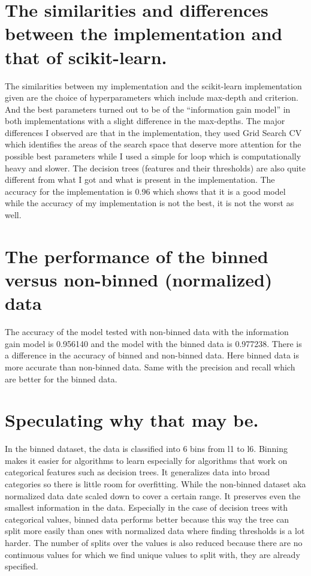 \documentclass[a4paper]{article}
\begin{document}
\section*{The similarities and differences between the implementation and that of scikit-learn.}
The similarities between my implementation and the scikit-learn implementation given are the choice of hyperparameters which include max-depth and criterion. And the best parameters turned out to be of the “information gain model” in both implementations with a slight difference in the max-depths. The major differences I observed are that in the implementation, they used Grid Search CV which identifies the areas of the search space that deserve more attention for the possible best parameters while I used a simple for loop which is computationally heavy and slower. The decision trees (features and their thresholds) are also quite different from what I got and what is present in the implementation. The accuracy for the implementation is 0.96 which shows that it is a good model while the accuracy of my implementation is not the best, it is not the worst as well.


\section*{The performance of the binned versus non-binned (normalized) data}
The accuracy of the model tested with non-binned data with the information gain model is 0.956140 and the model with the binned data is 0.977238. There is a difference in the accuracy of binned and non-binned data. Here binned data is more accurate than non-binned data. Same with the precision and recall which are better for the binned data.

\section*{Speculating why that may be.}
In the binned dataset, the data is classified into 6 bins from l1 to l6. Binning makes it easier for algorithms to learn especially for algorithms that work on categorical features such as decision trees. It generalizes data into broad categories so there is little room for overfitting. While the non-binned dataset aka normalized data date scaled down to cover a certain range. It preserves even the smallest information in the data. Especially in the case of decision trees with categorical values, binned data performs better because this way the tree can split more easily than ones with normalized data where finding thresholds is a lot harder. The number of splits over the values is also reduced because there are no continuous values for which we find unique values to split with, they are already specified.
\end{document}

